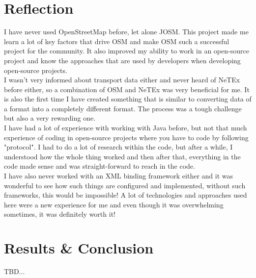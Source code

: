 \section{Reflection}
I have never used OpenStreetMap before, let alone JOSM. This project made me learn a lot of key factors that drive OSM and make OSM such a successful project for the community. It also improved my ability to work in an open-source project and know the approaches that are used by developers when developing open-source projects.\\
\newline
I wasn't very informed about transport data either and never heard of NeTEx before either, so a combination of OSM and NeTEx was very beneficial for me. It is also the first time I have created something that is similar to converting data of a format into a completely different format. The process was a tough challenge but also a very rewarding one.\\
\newline
I have had a lot of experience with working with Java before, but not that much experience of coding in open-source projects where you have to code by following "protocol". I had to do a lot of research within the code, but after a while, I understood how the whole thing worked and then after that, everything in the code made sense and was straight-forward to reach in the code.\\
\newline
I have also never worked with an XML binding framework either and it was wonderful to see how such things are configured and implemented, without such frameworks, this would be impossible! A lot of technologies and approaches used here were a new experience for me and even though it was overwhelming sometimes, it was definitely worth it!
\newpage
\section{Results \& Conclusion}
TBD...
